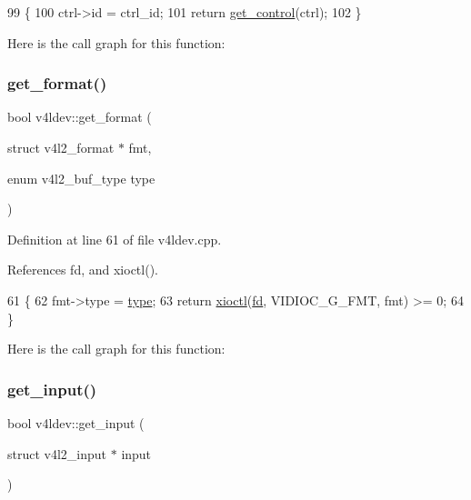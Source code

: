 \begin{DoxyCode}
99                                                                          \{
100     ctrl->id = ctrl\_id;
101     \textcolor{keywordflow}{return} \hyperlink{classv4ldev_a8b7c5ca137d864c8ffe32349b0aeb01a}{get\_control}(ctrl);
102 \}
\end{DoxyCode}
Here is the call graph for this function\+:
\mbox{\label{classv4ldev_a001ffb48bb1981b038ed6878b148a18e}} 
\subsubsection{\texorpdfstring{get\+\_\+format()}{get\_format()}}
{\footnotesize\ttfamily bool v4ldev\+::get\+\_\+format (\begin{DoxyParamCaption}\item[{struct v4l2\+\_\+format $\ast$}]{fmt,  }\item[{enum v4l2\+\_\+buf\+\_\+type}]{type }\end{DoxyParamCaption})}



Definition at line 61 of file v4ldev.\+cpp.



References fd, and xioctl().


\begin{DoxyCode}
61                                                                          \{
62     fmt->type = \hyperlink{classstd_1_1conditional_1_1type}{type};
63     \textcolor{keywordflow}{return} \hyperlink{classv4ldev_ab93cb1ab18254ca362310b006bd2552d}{xioctl}(\hyperlink{classv4ldev_a2cd44be3be75a19ab8bec12b28e29142}{fd}, VIDIOC\_G\_FMT, fmt) >= 0;
64 \}
\end{DoxyCode}
Here is the call graph for this function\+:
\mbox{\label{classv4ldev_a517ba36f366611d3cd72c8edb5cddd1f}} 
\subsubsection{\texorpdfstring{get\+\_\+input()}{get\_input()}}
{\footnotesize\ttfamily bool v4ldev\+::get\+\_\+input (\begin{DoxyParamCaption}\item[{struct v4l2\+\_\+input $\ast$}]{input }\end{DoxyParamCaption})}



